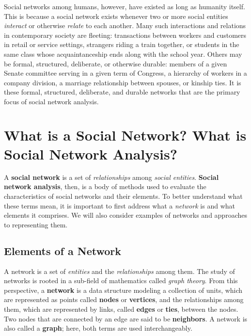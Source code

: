 \documentclass{book}
\begin{document}
Social networks among humans, however, have existed as long as humanity
itself. This is because a social network exists whenever two or more social
entities \emph{interact} or otherwise \emph{relate} to each another. Many such
interactions and relations in contemporary society are fleeting: transactions
between workers and customers in retail or service settings, strangers riding
a train together, or students in the same class whose acquaintanceship ends
along with the school year. Others may be formal, structured, deliberate, or
otherwise durable: members of a given Senate committee serving in a given term
of Congress, a hierarchy of workers in a company division, a marriage
relationship between spouses, or kinship ties. It is these formal, structured,
deliberate, and durable networks that are the primary focus of social network
analysis.

\hypertarget{what-is-a-social-network-what-is-social-network-analysis}{%
\section{What is a Social Network? What is Social Network
Analysis?}\label{what-is-a-social-network-what-is-social-network-analysis}}

A \textbf{social network} is a set of \emph{relationships} among \emph{social
entities}. \textbf{Social network analysis}, then, is a body of methods used
to evaluate the characteristics of social networks and their elements. To
better understand what these terms mean, it is important to first address what
a \emph{network} is and what elements it comprises. We will also consider
examples of networks and approaches to representing them.

\hypertarget{netElem}{%
\subsection{Elements of a Network}\label{netElem}}

A network is a set of \emph{entities} and the \emph{relationships} among them.
The study of networks is rooted in a sub-field of mathematics called
\emph{graph theory}. From this perspective, a \textbf{network} is a data
structure modeling a collection of units, which are represented as points
called \textbf{nodes} or \textbf{vertices}, and the relationships among them,
which are represented by links, called \textbf{edges} or \textbf{ties},
between the nodes. Two nodes that are connected by an edge are said to be
\textbf{neighbors}. A network is also called a \textbf{graph}; here, both
terms are used interchangeably.
\end{document}

